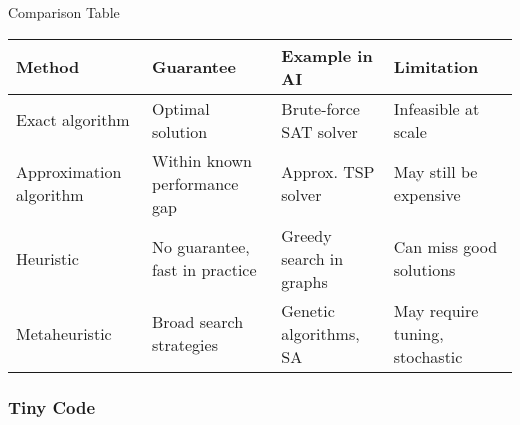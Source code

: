 \documentclass[
  letterpaper,
  DIV=11,
  numbers=noendperiod]{scrreprt}
\begin{document}
Comparison Table

\begin{longtable}[]{@{}
  >{\raggedright\arraybackslash}p{}
  >{\raggedright\arraybackslash}p{}
  >{\raggedright\arraybackslash}p{}
  >{\raggedright\arraybackslash}p{}@{}}
\toprule\noalign{}
\begin{minipage}[b]{\linewidth}\raggedright
Method
\end{minipage} & \begin{minipage}[b]{\linewidth}\raggedright
Guarantee
\end{minipage} & \begin{minipage}[b]{\linewidth}\raggedright
Example in AI
\end{minipage} & \begin{minipage}[b]{\linewidth}\raggedright
Limitation
\end{minipage} \\
\midrule\noalign{}
\endhead
\bottomrule\noalign{}
\endlastfoot
Exact algorithm & Optimal solution & Brute-force SAT solver & Infeasible
at scale \\
Approximation algorithm & Within known performance gap & Approx. TSP
solver & May still be expensive \\
Heuristic & No guarantee, fast in practice & Greedy search in graphs &
Can miss good solutions \\
Metaheuristic & Broad search strategies & Genetic algorithms, SA & May
require tuning, stochastic \\
\end{longtable}

\subsubsection{Tiny Code}\label{tiny-code-35}
\end{document}
